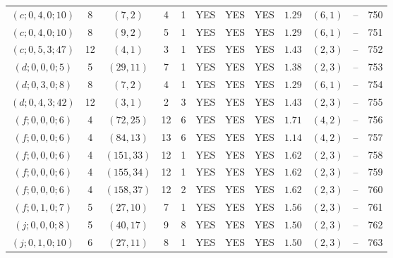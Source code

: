\begin{longtable}{|c|c|c|c|c|c|c|c|c|c|c|c|}
$(c;0,4,0;10)$ & 8 & $(7,2)$ & 4 & 1 & YES & YES & YES & $1.29$ & $(6,1)$ & -- & 750\\
$(c;0,4,0;10)$ & 8 & $(9,2)$ & 5 & 1 & YES & YES & YES & $1.29$ & $(6,1)$ & -- & 751\\
$(c;0,5,3;47)$ & 12 & $(4,1)$ & 3 & 1 & YES & YES & YES & $1.43$ & $(2,3)$ & -- & 752\\
$(d;0,0,0;5)$ & 5 & $(29,11)$ & 7 & 1 & YES & YES & YES & $1.38$ & $(2,3)$ & -- & 753\\
$(d;0,3,0;8)$ & 8 & $(7,2)$ & 4 & 1 & YES & YES & YES & $1.29$ & $(6,1)$ & -- & 754\\
$(d;0,4,3;42)$ & 12 & $(3,1)$ & 2 & 3 & YES & YES & YES & $1.43$ & $(2,3)$ & -- & 755\\
$(f;0,0,0;6)$ & 4 & $(72,25)$ & 12 & 6 & YES & YES & YES & $1.71$ & $(4,2)$ & -- & 756\\
$(f;0,0,0;6)$ & 4 & $(84,13)$ & 13 & 6 & YES & YES & YES & $1.14$ & $(4,2)$ & -- & 757\\
$(f;0,0,0;6)$ & 4 & $(151,33)$ & 12 & 1 & YES & YES & YES & $1.62$ & $(2,3)$ & -- & 758\\
$(f;0,0,0;6)$ & 4 & $(155,34)$ & 12 & 1 & YES & YES & YES & $1.62$ & $(2,3)$ & -- & 759\\
$(f;0,0,0;6)$ & 4 & $(158,37)$ & 12 & 2 & YES & YES & YES & $1.62$ & $(2,3)$ & -- & 760\\
$(f;0,1,0;7)$ & 5 & $(27,10)$ & 7 & 1 & YES & YES & YES & $1.56$ & $(2,3)$ & -- & 761\\
$(j;0,0,0;8)$ & 5 & $(40,17)$ & 9 & 8 & YES & YES & YES & $1.50$ & $(2,3)$ & -- & 762\\
$(j;0,1,0;10)$ & 6 & $(27,11)$ & 8 & 1 & YES & YES & YES & $1.50$ & $(2,3)$ & -- & 763
\end{longtable}
